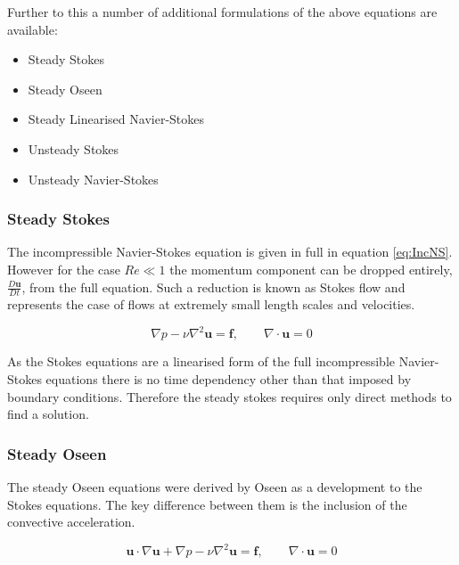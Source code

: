\documentclass[11pt, a4paper]{report}
\begin{document}
\noindent
Further to this a number of additional formulations of the above equations are available:
\begin{itemize}
\item Steady Stokes
\item Steady Oseen
\item Steady Linearised Navier-Stokes
\item Unsteady Stokes
\item Unsteady Navier-Stokes
\end{itemize}

\subsubsection{Steady Stokes}
The incompressible Navier-Stokes equation is given in full in equation \ref{eq:IncNS}. However for the case $Re \ll 1$ the momentum component can be dropped entirely, $\frac{D \mathbf{u}}{D t}$, from the full equation. Such a reduction is known as Stokes flow and represents the case of flows at extremely small length scales and velocities.

\begin{equation}
\nabla p - \nu \nabla^{2} \mathbf{u} = \mathbf{f}, \qquad \nabla \cdot \mathbf{u} = 0
\label{eq:SteadyStokes}
\end{equation}

As the Stokes equations are a linearised form of the full incompressible Navier-Stokes equations there is no time dependency other than that imposed by boundary conditions. Therefore the steady stokes requires only direct methods to find a solution.

\subsubsection{Steady Oseen}
The steady Oseen equations were derived by Oseen\cite{Oseen1910} as a development to the Stokes equations. The key difference between them is the inclusion of the convective acceleration.

\begin{equation}
\mathbf{u} \cdot \nabla \mathbf{u} + \nabla p - \nu \nabla^{2} \mathbf{u} = \mathbf{f}, \qquad \nabla \cdot \mathbf{u} = 0
\label{eq:SteadyOseen}
\end{equation}
\end{document}
